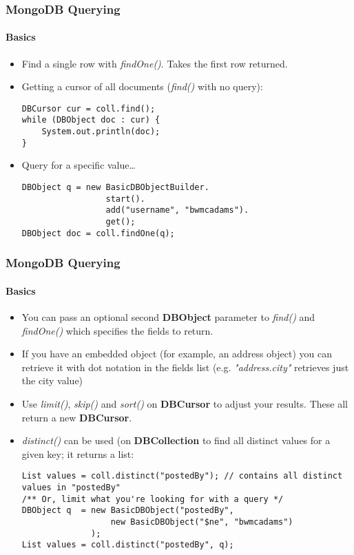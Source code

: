 \documentclass{beamer}
\begin{document}
\begin{frame}[fragile]
\frametitle{MongoDB Querying}
\framesubtitle{Basics}
    \begin{itemize}
        \item Find a single row with {\em findOne()}.  Takes the first row returned.
        \item<2-> Getting a cursor of all documents ({\em find()} with no query):\\ 
\begin{lstlisting}
DBCursor cur = coll.find();
while (DBObject doc : cur) {
    System.out.println(doc);
}
\end{lstlisting}
        \item<3-> Query for a specific value\ldots  \\
\begin{lstlisting}
DBObject q = new BasicDBObjectBuilder.
                 start().
                 add("username", "bwmcadams").
                 get();
DBObject doc = coll.findOne(q); 
\end{lstlisting}
    \end{itemize}
\end{frame}

\begin{frame}[fragile]
\frametitle{MongoDB Querying}
\framesubtitle{Basics}
    \begin{itemize}
        \item You can pass an optional second {\bf DBObject} parameter to {\em find()} and {\em findOne()} which specifies the fields to return. 
        \item If you have an embedded object (for example, an address object) you can retrieve it with dot notation in the fields list (e.g. {\em "address.city"} retrieves just the city value)
        \item Use {\em limit()}, {\em skip()} and {\em sort()} on {\bf DBCursor} to adjust your results.  These all return a new {\bf DBCursor}.  
        \item {\em distinct()} can be used (on {\bf DBCollection} to find all distinct values for a given key; it returns a list:
            \begin{lstlisting}
List values = coll.distinct("postedBy"); // contains all distinct values in "postedBy"
/** Or, limit what you're looking for with a query */
DBObject q  = new BasicDBObject("postedBy", 
                  new BasicDBObject("$ne", "bwmcadams")
              );
List values = coll.distinct("postedBy", q);
            \end{lstlisting}
    \end{itemize}
\end{frame}
\end{document}
